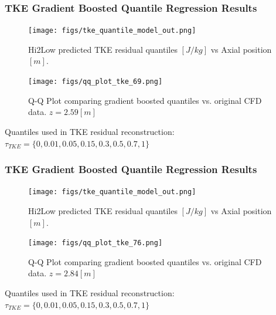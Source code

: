 \documentclass[t, pdftex]{beamer}
\begin{document}
\begin{frame}\frametitle{TKE Gradient Boosted Quantile Regression Results}
    \begin{figure}
        \centering
        \begin{minipage}{.5\textwidth}
            \centering
            \texttt{[image: figs/tke\_quantile\_model\_out.png]}
            \caption{Hi2Low predicted TKE residual quantiles $[J/kg]$ vs Axial position $[m]$.}
        \end{minipage}%
        \begin{minipage}{.5\textwidth}
            \centering
            \texttt{[image: figs/qq\_plot\_tke\_69.png]}
            \caption{Q-Q Plot comparing gradient boosted quantiles vs. original CFD data. $z=2.59[m]$}
        \end{minipage}
    \end{figure}
Quantiles used in TKE residual reconstruction: $\tau_{TKE}=\{0, 0.01, 0.05, 0.15, 0.3, 0.5, 0.7, 1\}$
\end{frame}

\begin{frame}\frametitle{TKE Gradient Boosted Quantile Regression Results}
    \begin{figure}
        \centering
        \begin{minipage}{.5\textwidth}
            \centering
            \texttt{[image: figs/tke\_quantile\_model\_out.png]}
            \caption{Hi2Low predicted TKE residual quantiles $[J/kg]$ vs Axial position $[m]$.}
        \end{minipage}%
        \begin{minipage}{.5\textwidth}
            \centering
            \texttt{[image: figs/qq\_plot\_tke\_76.png]}
            \caption{Q-Q Plot comparing gradient boosted quantiles vs. original CFD data. $z=2.84[m]$}
        \end{minipage}
    \end{figure}
Quantiles used in TKE residual reconstruction: $\tau_{TKE}=\{0, 0.01, 0.05, 0.15, 0.3, 0.5, 0.7, 1\}$
\end{frame}
\end{document}

